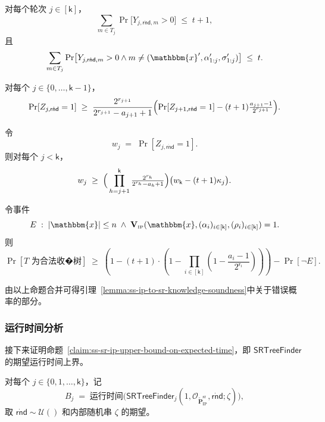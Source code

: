\documentclass[american,singlepageview]{snargs-book-zh}
\newcommand{\Malicious}[1]{\tilde{#1}}
\newcommand{\BlackBox}[1]{\mathcal{O}_{#1}}
\newcommand{\Instance}{\mathbbm{x}}
\newcommand{\ProtoProver}{P}
\newcommand{\ProtoVerifier}{V}
\newcommand{\ProtoRoundComplexity}{\mathsf{k}}
\newcommand{\ProtoRandomnessComplexity}{\mathsf{r}}
\newcommand{\RoundIndex}{i}
\newcommand{\SRSuperscript}{\mathrm{sr}}
\newcommand{\IPSubscript}{\scriptscriptstyle\mathrm{IP}}
\newcommand{\IPFormat}[1]{\mathbf{#1}}
\newcommand{\IPVerifier}{\IPFormat{\ProtoVerifier}_{\IPSubscript}}
\newcommand{\IPMaliciousProver}{\Malicious{\IPFormat{\ProtoProver}}_{\IPSubscript}}
\newcommand{\IPRoundComplexity}{\ProtoRoundComplexity}
\newcommand{\IPRandomnessCardinality}[1]{2^{\ProtoRandomnessComplexity_{#1}}}
\newcommand{\IPProverMessage}{\alpha}
\newcommand{\IPVerifierRandomMessage}{\rho}
\newcommand{\IPTuple}[1]{(#1_{\RoundIndex})_{\RoundIndex \in [\IPRoundComplexity]}}
\newcommand{\RODistribution}[1]{\mathcal{U}(#1)}
\newcommand{\LazySRRandomness}{\mathsf{r}\dot{\mathsf{n}}\mathsf{d}}
\newcommand{\SRBudget}{t}
\newcommand{\SRSaltString}{\sigma}
\newcommand{\IPMaliciousSRProver}{\IPMaliciousProver^{\SRSuperscript}}
\newcommand{\SSArity}{a}
\newcommand{\SSTree}{T}
\newcommand{\SSSRTreeFinder}{\mathsf{SRTreeFinder}}
\newcommand{\SSFinderRandomness}{\zeta}
\newcommand{\SSGoodChallengeNumber}{Y}
\newcommand{\SSFinderHasFound}{Z}
\newcommand{\SSKappa}{\kappa}
\newcommand{\SSWinningProbability}{w}
\newcommand{\SSFinderTime}{B}
\newcommand{\SSSRMoveSet}{T}
\newcommand{\IPKowledgeErrorMainFromSS}{\prod_{\RoundIndex \in [\IPRoundComplexity]} \left( 1 - \frac{\SSArity_{\RoundIndex}-1}{\IPRandomnessCardinality{\RoundIndex}} \right)}
\newcommand{\IPSRKowledgeErrorMainFromSS}{\IPKowledgeErrorMainFromSS}
\newcommand{\IPSRKowledgeErrorFromSS}{(\SRBudget+1) \cdot \left(1-\IPSRKowledgeErrorMainFromSS \right)}
\begin{document}
\begin{claim}
\label{claim:ss-sr-ip-sum-of-probabilities}
对每个轮次 $j\in[\IPRoundComplexity]$，
\[
\sum_{m\in \SSSRMoveSet_{j}}
\Pr\bigl[\SSGoodChallengeNumber_{j,\LazySRRandomness,m}>0\bigr]
\;\le\;
\SRBudget+1,
\]
且
\[
\sum_{m\in \SSSRMoveSet_{j}}
\Pr\bigl[\SSGoodChallengeNumber_{j,\LazySRRandomness,m}>0
\land m\neq(\Instance',\IPProverMessage'_{1:j},\SRSaltString'_{1:j})
\bigr]
\;\le\;
\SRBudget.
\]
\end{claim}

\begin{claim}
\label{claim:ss-ip-sr-recursive-success}
对每个 $j\in\{0,\dots,\IPRoundComplexity-1\}$，
\[
\Pr[\SSFinderHasFound_{j,\LazySRRandomness}=1]
\;\ge\;
\frac{2^{r_{j+1}}}{2^{r_{j+1}}-\SSArity_{j+1}+1}
\Bigl(\Pr[\SSFinderHasFound_{j+1,\LazySRRandomness}=1]-(\SRBudget+1)\tfrac{\SSArity_{j+1}-1}{2^{r_{j+1}}}\Bigr).
\]
\end{claim}

\begin{claim}
\label{claim:ss-ip-sr-induction-on-success}
令
\[
\SSWinningProbability_{j}
\;=\;
\Pr[\SSFinderHasFound_{j,\LazySRRandomness}=1].
\]
则对每个 $j<\IPRoundComplexity$，
\[
\SSWinningProbability_{j}
\;\ge\;
\Bigl(\,\prod_{h=j+1}^{\IPRoundComplexity}\tfrac{2^{r_h}}{2^{r_h}-\SSArity_h+1}\Bigr)
\bigl(\SSWinningProbability_{\IPRoundComplexity}-(\SRBudget+1)\SSKappa_{j}\bigr).
\]
\end{claim}

\begin{claim}
\label{claim:ss-sr-ip-lower-bound-on-valid-tree}
令事件
\[
E\;:\;|\Instance|\le n
\;\land\;
\IPVerifier(\Instance,\IPTuple{\IPProverMessage},\IPTuple{\IPVerifierRandomMessage})=1.
\]
则
\[
\Pr[\SSTree\text{ 为合法收�树}]\;\ge\;(1-\IPSRKowledgeErrorFromSS)-\Pr[\neg E].
\]
\end{claim}

\noindent 由以上命题合并可得引理~\ref{lemma:ss-ip-to-sr-knowledge-soundness}中关于错误概率的部分。

\subsubsection{运行时间分析}

接下来证明命题~\ref{claim:ss-sr-ip-upper-bound-on-expected-time}，即 $\SSSRTreeFinder$ 的期望运行时间上界。

\begin{definition}
对每个 $j\in\{0,1,\dots,\IPRoundComplexity\}$，记
\[
\SSFinderTime_{j}
\;=\;
\text{运行时间}\bigl(\SSSRTreeFinder_{j}(1,\BlackBox{\IPMaliciousSRProver},\LazySRRandomness;\SSFinderRandomness)\bigr),
\]
取 $\LazySRRandomness\sim\RODistribution{}$ 和内部随机串 $\SSFinderRandomness$ 的期望。
\end{definition}
\end{document}
